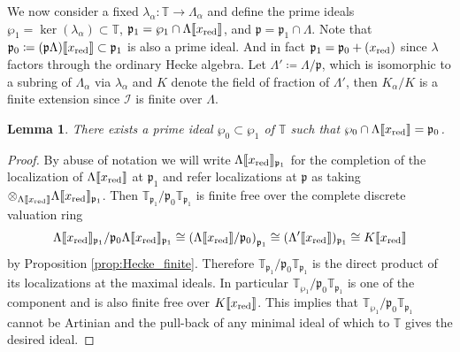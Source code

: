 \documentclass[leqno]{amsart}
\newtheorem{lem}[thm]{Lemma}
\theoremstyle{definition}
\theoremstyle{remark}
\newcommand{\fp}{\mathfrak{p}}
\newcommand{\xx}{x_\textnormal{red}}
\newcommand{\TT}{\mathbb{T}} %
\newcommand{\I}{\mathcal{I}} %
\begin{document}
We now consider a fixed 
$\lambda_\alpha\colon \TT\to \Lambda_\alpha$
and define the prime ideals 
$\wp_1=\ker(\lambda_\alpha)\subset \TT$,
$\fp_1=\wp_1\cap \Lambda\llbracket\xx\rrbracket$, and
$\fp=\fp_1\cap \Lambda$.
Note that $\fp_0\coloneqq (\fp\Lambda)\llbracket\xx\rrbracket\subset \fp_1$
is also a prime ideal.
And in fact $\fp_1=\fp_0+(\xx)$
since $\lambda$ factors through the ordinary Hecke algebra.
Let $\Lambda'\coloneqq \Lambda/\fp$,
which is isomorphic to a subring of $\Lambda_\alpha$ via $\lambda_\alpha$
and $K$ denote the field of fraction of $\Lambda'$,
then $K_\alpha/K$ is a finite extension 
since $\I$ is finite over $\Lambda$.


\begin{lem}\label{lem:smallprime}
There exists a prime ideal 
$\wp_0\subset \wp_1$ of $\TT$ such that 
$\wp_0\cap \Lambda\llbracket \xx\rrbracket=\fp_0$.
\end{lem}
\begin{proof}
By abuse of notation we will write
$\Lambda\llbracket\xx\rrbracket_{\fp_1}$
for the completion of the localization of
$\Lambda\llbracket\xx\rrbracket$ at $\fp_1$
and refer localizations at $\fp$ as taking
$\otimes_{\Lambda\llbracket\xx\rrbracket}
\Lambda\llbracket\xx\rrbracket_{\fp_1}$.
Then $\TT_{\fp_1}/\fp_0\TT_{\fp_1}$
is finite free over
the complete discrete valuation ring
\[
\Lambda\llbracket\xx\rrbracket_{\fp_1}/
\fp_0\Lambda\llbracket\xx\rrbracket_{\fp_1}\cong
\left(
\Lambda\llbracket\xx\rrbracket/\fp_0
\right)_{\fp_1}\cong
(\Lambda'\llbracket\xx\rrbracket)_{\fp_1}\cong 
K\llbracket\xx\rrbracket
\]
by Proposition \ref{prop:Hecke_finite}.
Therefore $\TT_{\fp_1}/\fp_0\TT_{\fp_1}$
is the direct product of its localizations at the maximal ideals.
In particular $\TT_{\wp_1}/\fp_0\TT_{\fp_1}$
is one of the component and is also finite free over 
$K\llbracket\xx\rrbracket$.
This implies that $\TT_{\wp_1}/\fp_0\TT_{\fp_1}$ cannot be Artinian
and the pull-back of any minimal ideal of which to $\TT$
gives the desired ideal.

\end{proof}
\end{document}
